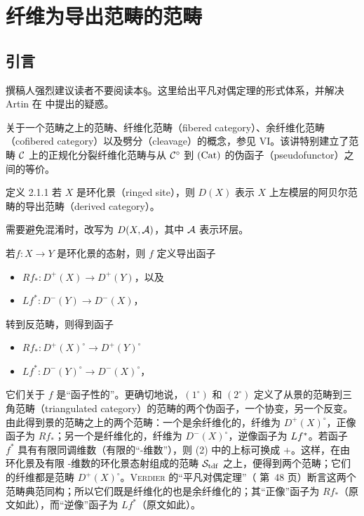 \section{纤维为导出范畴的范畴}

\subsection{引言}

撰稿人强烈建议读者不要阅读本\S。这里给出平凡对偶定理的形式体系，并解决 Artin 在  中提出的疑惑。

关于一个范畴之上的范畴、纤维化范畴（fibered category）、余纤维化范畴（cofibered category）以及劈分（cleavage）的概念，参见  VI。该讲特别建立了范畴 ${\mathcal C}$ 上的正规化分裂纤维化范畴与从 ${\mathcal C}^{\circ}$ 到 $(\operatorname{Cat})$ 的伪函子（pseudofunctor）之间的等价。

\begin{enonce*}{定义 2.1.1}
若 $X$ 是环化景（ringed site），则 $D(X)$ 表示 $X$ 上左模层的阿贝尔范畴的导出范畴（derived category）。
\end{enonce*}

需要避免混淆时，改写为 $D(X,{\mathcal A})$，其中 ${\mathcal A}$ 表示环层。

若\pageoriginale $f:X\rightarrow Y$ 是环化景的态射，则 $f$ 定义导出函子
\begin{itemize}
\item[(1)] $Rf_{\ast}:D^{+}(X)\rightarrow D^{+}(Y)$，以及

\item[(2)] $Lf^{\ast}:D^{-}(Y)\rightarrow D^{-}(X)$，
\end{itemize}
转到反范畴\sisi{}{}，则得到函子
\begin{itemize}
\item[$\rm(1^{\circ})$] $Rf_{\ast}:D^{+}(X)^{\circ}\rightarrow
D^{+}(Y)^{\circ}$

\item[$\rm(2^{\circ})$] $Lf^{\ast}:D^{-}(Y)^{\circ}\rightarrow
D^{-}(X)^{\circ}$，
\end{itemize}
它们关于 $f$ 是“函子性的”。更确切地说，$(1^{\circ})$ 和 $(2^{\circ})$ 定义了从景的范畴到三角范畴（triangulated category）的范畴的两个伪函子，一个协变，另一个反变。由此得到景的范畴之上的两个范畴：一个是余纤维化的，纤维为 $D^{+}(X)^{\circ}$，正像函子为 $Rf_{\ast}$；另一个是纤维化的，纤维为 $D^{-}(X)^{\circ}$，逆像函子为 $L f^{\ast}$。若函子 $f^{\ast}$ 具有有限同调维数（\ie 有限的“\tTor-维数”），则 (2) 中的上标可换成 $+$。这样，在由环化景及有限 \tTor-维数的环化景态射组成的范畴 ${\mathcal S}_{\operatorname{tdf}}$ 之上，便得到两个范畴\sisi{}{}；它们的纤维都是范畴 $D^{+}(X)^{\circ}$。\textsc{Verdier} 的“平凡对偶定理”（\cite{sga4.exp.XVII.bib.CD} 第~48 页）断言这两个范畴典范同构；所以它们既是纤维化的也是余纤维化的；其“正像”函子为 $Rf_{\ast}$\sisi{}{ }（原文如此），而“逆像”函子为 $Lf^{\ast}$\sisi{}{ }（原文如此）。

